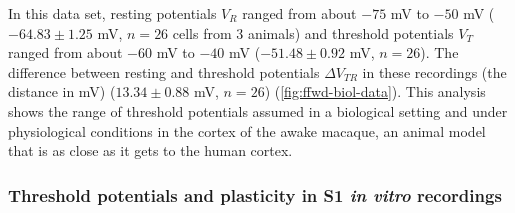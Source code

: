 In this data set, resting potentials $V_R$ ranged from about $-75$ mV to $-50$ mV
            ($-64.83 \pm 1.25$ mV,
            $n = 26$ cells from 3 animals)
        and threshold potentials $V_T$ ranged from about $-60$ mV to $-40$ mV
            ($-51.48 \pm 0.92$ mV,
            $n = 26$).
    The difference between resting and threshold potentials
        $\Delta V_{TR}$ in these recordings (the distance in mV)
            ($13.34 \pm 0.88$ mV,
            $n = 26$)
        (\autoref{fig:ffwd-biol-data}).
    This analysis shows the range of threshold potentials assumed
        in a biological setting and under physiological conditions
        in the cortex of the awake macaque,
        an animal model that is as close as it gets to the human cortex.

\subsubsection*{Threshold potentials and plasticity in S1 \textit{in vitro} recordings}


